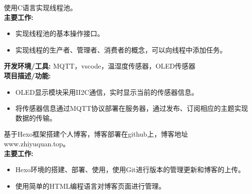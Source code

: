 \documentclass{resume}
\begin{document}


\begin{onehalfspacing}
  使用C语言实现线程池。\\
  \textbf {主要工作:}
  \begin{itemize}

    \item 实现线程池的基本操作接口。
      \item 实现线程的生产者、管理者、消费者的概念，可以向线程中添加任务。

  \end{itemize}

\end{onehalfspacing}







\begin{onehalfspacing}
 \textbf {开发环境/工具:}  MQTT，vscode，温湿度传感器，OLED传感器\\
  \textbf {项目描述/功能:}
  \begin{itemize}
  \item OLED显示模块采用II2C通信，实时显示当前的传感器信息。
  \item 将传感器信息通过MQTT协议部署在服务器，通过发布、订阅相应的主题实现数据的传输。
  \end{itemize}
\end{onehalfspacing}





\begin{onehalfspacing}
  基于Hexo框架搭建个人博客，博客部署在github上，博客地址 www.zhiyuquan.top。\quad \\
  \textbf {主要工作:}
  \begin{itemize}

    \item Hexo环境的搭建、部署、使用，使用Git进行版本的管理更新和博客的上传。
      \item 使用简单的HTML编程语言对博客页面进行管理。

  \end{itemize}

\end{onehalfspacing}
\end{document}
